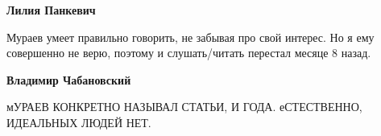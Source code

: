 \begin{itemize}
\begin{itemize}
\textbf{Лилия Панкевич} 

Мураев умеет правильно говорить, не забывая про свой интерес. Но я ему
совершенно не верю, поэтому и слушать/читать перестал месяце 8 назад.

\textbf{Владимир Чабановский} 

мУРАЕВ КОНКРЕТНО НАЗЫВАЛ СТАТЬИ, И ГОДА. еСТЕСТВЕННО, ИДЕАЛЬНЫХ ЛЮДЕЙ НЕТ.

\end{itemize} %


\end{itemize} %
